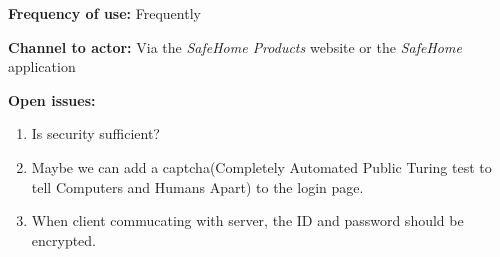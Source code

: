 \documentclass[twoside,11pt]{article}
\begin{document}
\begin{center}
{{\begin{multicols}{2}
                \textbf{Frequency of use:} Frequently

                \textbf{Channel to actor:} Via the \emph{SafeHome Products} website or the \emph{SafeHome} application

                \textbf{Open issues:}

                \begin{enumerate}
                    \item Is security sufficient? 
                    \item Maybe we can add a captcha(Completely Automated Public Turing test to tell Computers and Humans Apart) to the login page.
                    \item When client commucating with server, the ID and password should be encrypted.
                \end{enumerate}

            \end{multicols}}}
\end{center}


\vskip 0.2in


\end{document}
